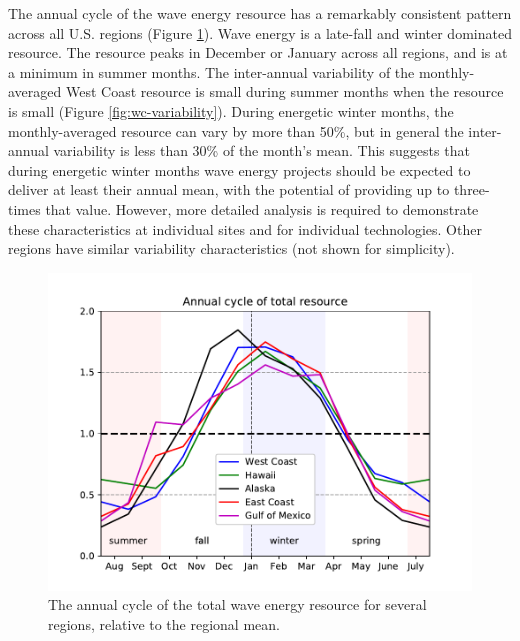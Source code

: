 The annual cycle of the wave energy resource has a remarkably consistent pattern across all U.S. regions (Figure \ref{fig:annual-cycle}). Wave energy is a late-fall and winter dominated resource. The resource peaks in December or January across all regions, and is at a minimum in summer months. The inter-annual variability of the monthly-averaged West Coast resource is small during summer months when the resource is small (Figure \ref{fig:wc-variability}). During energetic winter months, the monthly-averaged resource can vary by more than 50\%, but in general the inter-annual variability is less than 30\% of the month's mean. This suggests that during energetic winter months wave energy projects should be expected to deliver at least their annual mean, with the potential of providing up to three-times that value.  However, more detailed analysis is required to demonstrate these characteristics at individual sites and for individual technologies. Other regions have similar variability characteristics (not shown for simplicity).

\begin{figure}[ht]
  \centering
  \includegraphics[width=\textwidth]{../fig/AnnualCycle01.pdf}
  \caption[Wave resource annual cycle.]{The annual cycle of the total wave energy resource for several regions, relative to the regional mean.}
  \label{fig:annual-cycle}
\end{figure}


